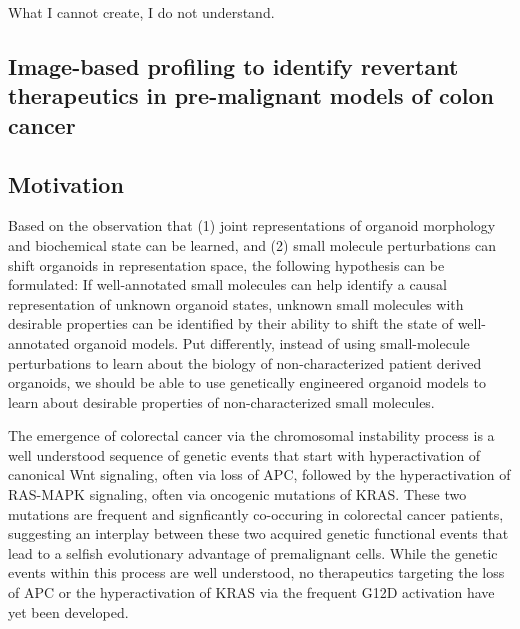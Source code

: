 \begin{savequote}[75mm]
What I cannot create, I do not understand.
\end{savequote}

\begin{flushleft}
\chapter{Image-based profiling to identify revertant therapeutics in pre-malignant models of colon cancer}

\section{Motivation}

Based on the observation that (1) joint representations of organoid morphology and biochemical state can be learned, and (2) small molecule perturbations can shift organoids in representation space, the following hypothesis can be formulated: If well-annotated small molecules can help identify a causal representation of unknown organoid states, unknown small molecules with desirable properties can be identified by their ability to shift the state of well-annotated organoid models. 
Put differently, instead of using small-molecule perturbations to learn about the biology of non-characterized patient derived organoids, we should be able to use genetically engineered organoid models to learn about desirable properties of non-characterized small molecules.

The emergence of colorectal cancer via the chromosomal instability process is a well understood sequence of genetic events that start with hyperactivation of canonical Wnt signaling, often via loss of APC, followed by the hyperactivation of RAS-MAPK signaling, often via oncogenic mutations of KRAS. These two mutations are frequent and signficantly co-occuring in colorectal cancer patients, suggesting an interplay between these two acquired genetic functional events that lead to a selfish evolutionary advantage of premalignant cells. While the genetic events within this process are well understood, no therapeutics targeting the loss of APC or the hyperactivation of KRAS via the frequent G12D activation have yet been developed. 


\end{flushleft}
